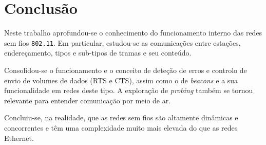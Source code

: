 \documentclass{llncs}
\begin{document}
\section{Conclusão}
\hspace{3mm}

Neste trabalho aprofundou-se o conhecimento do funcionamento interno das redes sem fios \texttt{802.11}. Em particular, estudou-se as comunicações entre estações, endereçamento, tipos e sub-tipos de tramas e seu conteúdo.

Consolidou-se o funcionamento e o conceito de deteção de erros e controlo de envio de volumes de dados (RTS e CTS), assim como o de \textit{beacons} e a sua funcionalidade em redes deste tipo. A exploração de \textit{probing} também se tornou relevante para entender comunicação por meio de ar.

Concluiu-se, na realidade, que as redes sem fios são altamente dinâmicas e concorrentes e têm uma complexidade muito mais elevada do que as redes Ethernet.

\end{document}
